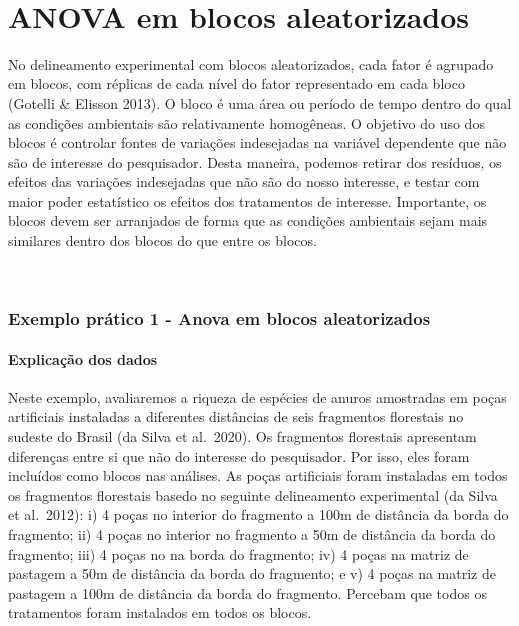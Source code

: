 \documentclass[
]{book}
\begin{document}
~

\hypertarget{anova-em-blocos-aleatorizados}{%
\section{ANOVA em blocos aleatorizados}\label{anova-em-blocos-aleatorizados}}

No delineamento experimental com blocos aleatorizados, cada fator é agrupado em blocos, com réplicas de cada nível do fator representado em cada bloco (Gotelli \& Elisson 2013). O bloco é uma área ou período de tempo dentro do qual as condições ambientais são relativamente homogêneas. O objetivo do uso dos blocos é controlar fontes de variações indesejadas na variável dependente que não são de interesse do pesquisador. Desta maneira, podemos retirar dos resíduos, os efeitos das variações indesejadas que não são do nosso interesse, e testar com maior poder estatístico os efeitos dos tratamentos de interesse. Importante, os blocos devem ser arranjados de forma que as condições ambientais sejam mais similares dentro dos blocos do que entre os blocos.

~

\hypertarget{exemplo-pruxe1tico-1---anova-em-blocos-aleatorizados}{%
\subsubsection{Exemplo prático 1 - Anova em blocos aleatorizados}\label{exemplo-pruxe1tico-1---anova-em-blocos-aleatorizados}}

\hypertarget{explicauxe7uxe3o-dos-dados-10}{%
\paragraph{Explicação dos dados}\label{explicauxe7uxe3o-dos-dados-10}}

Neste exemplo, avaliaremos a riqueza de espécies de anuros amostradas em poças artificiais instaladas a diferentes distâncias de seis fragmentos florestais no sudeste do Brasil (da Silva et al.~2020). Os fragmentos florestais apresentam diferenças entre si que não do interesse do pesquisador. Por isso, eles foram incluídos como blocos nas análises. As poças artificiais foram instaladas em todos os fragmentos florestais basedo no seguinte delineamento experimental (da Silva et al.~2012): i) 4 poças no interior do fragmento a 100m de distância da borda do fragmento; ii) 4 poças no interior no fragmento a 50m de distância da borda do fragmento; iii) 4 poças no na borda do fragmento; iv) 4 poças na matriz de pastagem a 50m de distância da borda do fragmento; e v) 4 poças na matriz de pastagem a 100m de distância da borda do fragmento. Percebam que todos os tratamentos foram instalados em todos os blocos.
\end{document}
